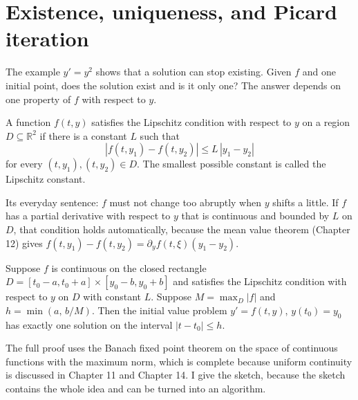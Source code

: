 
\section{Existence, uniqueness, and Picard iteration}

The example $y'=y^{2}$ shows that a solution can stop existing. Given $f$ and one initial
point, does the solution exist and is it only one? The answer depends on one property of $f$
with respect to $y$.

\begin{definisi}
A function $f(t,y)$ satisfies the Lipschitz condition with respect to $y$ on a region
$D\subseteq\mathbb{R}^{2}$ if there is a constant $L$ such that
\[
|f(t,y_{1})-f(t,y_{2})|\le L\,|y_{1}-y_{2}|
\]
for every $(t,y_{1}),(t,y_{2})\in D$. The smallest possible constant is called the Lipschitz
constant.
\end{definisi}

Its everyday sentence: $f$ must not change too abruptly when $y$ shifts a little. If $f$ has
a partial derivative with respect to $y$ that is continuous and bounded by $L$ on $D$, that
condition holds automatically, because the mean value theorem (Chapter 12) gives
$f(t,y_{1})-f(t,y_{2})=\partial_{y}f(t,\xi)(y_{1}-y_{2})$.

\begin{teorema}
Suppose $f$ is continuous on the closed rectangle
$D=[t_{0}-a,t_{0}+a]\times[y_{0}-b,y_{0}+b]$ and satisfies the Lipschitz condition with
respect to $y$ on $D$ with constant $L$. Suppose $M=\max_{D}|f|$ and
$h=\min(a,\,b/M)$. Then the initial value problem $y'=f(t,y)$, $y(t_{0})=y_{0}$ has exactly
one solution on the interval $|t-t_{0}|\le h$.
\end{teorema}

The full proof uses the Banach fixed point theorem on the space of continuous functions with
the maximum norm, which is complete because uniform continuity is discussed in Chapter 11
and Chapter 14. I give the sketch, because the sketch contains the whole idea and can be
turned into an algorithm.

